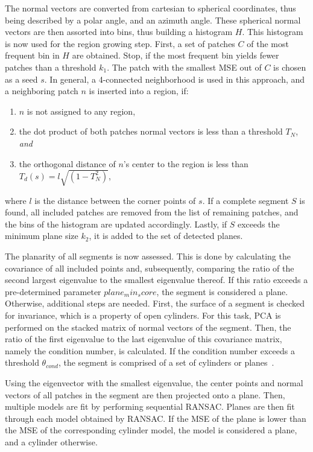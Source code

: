 \documentclass[main.tex]{subfiles}
\begin{document}
The normal vectors are converted from cartesian to spherical coordinates, thus being described by a polar angle, and
an azimuth angle. These spherical normal vectors are then assorted into bins, thus building a histogram $H$.
This histogram is now used for the region growing step.
First, a set of patches $C$ of the most frequent bin in $H$ are obtained. Stop, if the most frequent bin
yields fewer patches than a threshold $k_1$. The patch with the smallest MSE out of $C$ is chosen as a seed $s$.
In general, a 4-connected neighborhood is used in this approach, and a neighboring patch $n$ is inserted into a region, if:
\begin{enumerate}
    \item $n$ is not assigned to any region,
    \item the dot product of both patches normal vectors is less than a threshold $T_N$, \textit{and}
    \item the orthogonal distance of $n$'s center to the region is less than $T_d(s) = l\sqrt{(1-T_N^2)}$,
\end{enumerate}
where $l$ is the distance between the corner points of $s$.
If a complete segment $S$ is found, all included patches are removed from the list of remaining patches, and
the bins of the histogram are updated accordingly. Lastly, if $S$ exceeds the minimum plane size $k_2$, it is added
to the set of detected planes.

The planarity of all segments is now assessed. This is done by calculating the covariance of all included points and,
subsequently, comparing the ratio of the second largest eigenvalue to the smallest eigenvalue thereof. If this ratio
exceeds a pre-determined parameter $plane_min_score$, the segment is considered a plane.
Otherwise, additional steps are needed.
First, the surface of a segment is checked for invariance, which is a property of open cylinders.
For this task, PCA is performed on the stacked matrix of normal vectors of the segment.
Then, the ratio of the first eigenvalue to the last eigenvalue of this covariance matrix, namely the condition number,
is calculated. If the condition number exceeds a threshold $\theta_{cond}$, the segment is comprised of a set of
cylinders or planes~\cite[Section~III.D]{Proença_Gao_2018}.

Using the eigenvector with the smallest eigenvalue, the center points and normal vectors of all patches
in the segment are then projected onto a plane. Then, multiple models are fit by performing sequential RANSAC.
Planes are then fit through each model obtained by RANSAC. If the MSE of the plane is lower than the MSE of
the corresponding cylinder model, the model is considered a plane, and a cylinder otherwise.
\end{document}
